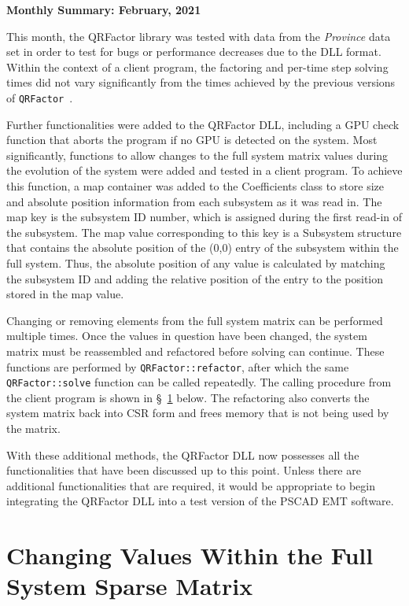 \documentclass[11pt,letterpaper]{article}
\newcommand{\qrf}{\texttt{QRFactor}}
\begin{document}
\begin{center}
    {\Large \bf Monthly Summary: February, 2021}
\end{center}

This month, the QRFactor library was tested with data from the \emph{Province} data set in order to test for bugs or performance decreases due to the DLL format. Within the context of a client program, the factoring and per-time step solving times did not vary significantly from the times achieved by the previous versions of \qrf~.

Further functionalities were added to the QRFactor DLL, including a GPU check function that aborts the program if no GPU is detected on the system. Most significantly, functions to allow changes to the full system matrix values during the evolution of the system were added and tested in a client program. To achieve this function, a map container was added to the Coefficients class to store size and absolute position information from each subsystem as it was read in. The map key is the subsystem ID number, which is assigned during the first read-in of the subsystem. The map value corresponding to this key is a Subsystem structure that contains the absolute position of the (0,0) entry of the subsystem within the full system. Thus, the absolute position of any value is calculated by matching the subsystem ID and adding the relative position of the entry to the position stored in the map value.

Changing or removing elements from the full system matrix can be performed multiple times. Once the values in question have been changed, the system matrix must be reassembled and refactored before solving can continue. These functions are performed by \verb+QRFactor::refactor+, after which the same \verb+QRFactor::solve+ function can be called repeatedly. The calling procedure from the client program is shown in \S\!~\ref{sec: client} below. The refactoring also converts the system matrix back into CSR form and frees memory that is not being used by the matrix.

With these additional methods, the QRFactor DLL now possesses all the  functionalities that have been discussed up to this point. Unless there are additional functionalities that are required, it would be appropriate to begin integrating the QRFactor DLL into a test version of the PSCAD EMT software.

\section{Changing Values Within the Full System Sparse Matrix}
\label{sec: client}
\end{document}
